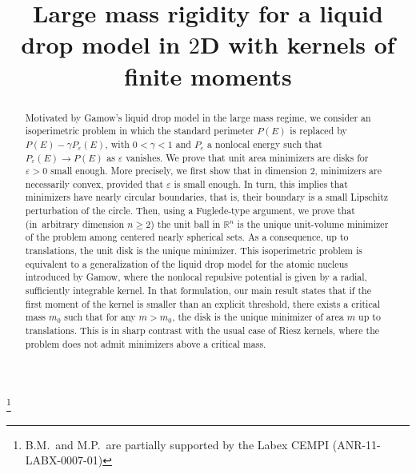 \documentclass[JEP,XML,SOM,Unicode,published]{cedram}
\numberwithin{equation}{section}
\theoremstyle{plain}
\theoremstyle{definition}
\begin{document}
\frontmatter

\title[Large mass rigidity for a liquid drop model in $2$D]{Large mass rigidity for a liquid drop model in $2$D with kernels of finite moments}

\author[\initial{B.} \lastname{Merlet}]{ }
\address{Univ. Lille, CNRS, Inria, UMR 8524 - Laboratoire Paul Painlevé\\
F-59000 Lille, France}

\author[\initial{M.} \lastname{Pegon}]{ }
\address{Univ. Lille, CNRS, Inria, UMR 8524 - Laboratoire Paul Painlevé\\
F-59000 Lille, France}

\thanks{B.M.\ and M.P.\ are partially supported by the Labex CEMPI (ANR-11-LABX-0007-01)}

\begin{abstract}
Motivated by Gamow's liquid drop model in the large mass regime, we consider an isoperimetric problem in which the standard perimeter $P(E)$ is replaced by $P(E)-\gamma P_\varepsilon(E)$, with $0<\gamma<1$ and $P_\varepsilon$ a nonlocal energy such that $P_\varepsilon(E)\to P(E)$ as $\varepsilon$ vanishes. We prove that unit area minimizers are disks for $\varepsilon>0$ small enough. More precisely, we first show that in dimension $2$, minimizers are necessarily convex, provided that $\varepsilon$ is small enough. In turn, this implies that minimizers have nearly circular boundaries, that is, their boundary is a small Lipschitz perturbation of the circle. Then, using a Fuglede-type argument, we prove that (in~arbitrary dimension $n\geq 2$) the unit ball in $\mathbb{R}^n$ is the unique unit-volume minimizer of the problem among centered nearly spherical sets. As a consequence, up to translations, the unit disk is the unique minimizer. This isoperimetric problem is equivalent to a generalization of the liquid drop model for the atomic nucleus introduced by Gamow, where the nonlocal repulsive potential is given by a radial, sufficiently integrable kernel. In that formulation, our main result states that if the first moment of the kernel is smaller than an explicit threshold, there exists a critical mass $m_0$ such that for any $m>m_0$, the disk is the unique minimizer of area $m$ up to translations. This is in sharp contrast with the usual case of Riesz kernels, where the problem does not admit minimizers above a critical mass.
\end{abstract}
\end{document}
